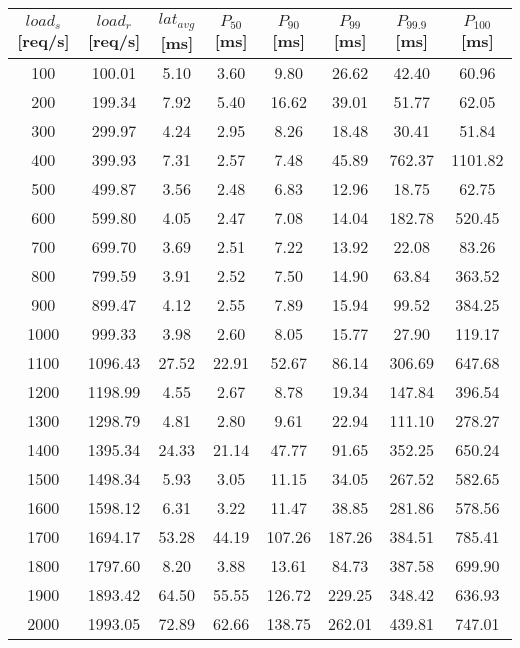 \begin{table}[!h]
	\begin{adjustwidth}{-2cm}{-2cm}
		\begin{tabular}{|c|c|c|c|c|c|c|c|}
			\hline
			 $load_{s}$ [req/s] & $load_{r}$ [req/s] & $lat_{avg}$ [ms] & $P_{50}$ [ms] & $P_{90}$ [ms] & $P_{99}$ [ms] & $P_{99.9}$ [ms] & $P_{100}$ [ms] \\
			\hline
			100 & 100.01 & 5.10 & 3.60 & 9.80 & 26.62 & 42.40 & 60.96 \\ \hline
			200 & 199.34 & 7.92 & 5.40 & 16.62 & 39.01 & 51.77 & 62.05 \\ \hline
			300 & 299.97 & 4.24 & 2.95 & 8.26 & 18.48 & 30.41 & 51.84 \\ \hline
			400 & 399.93 & 7.31 & 2.57 & 7.48 & 45.89 & 762.37 & 1101.82 \\ \hline
			500 & 499.87 & 3.56 & 2.48 & 6.83 & 12.96 & 18.75 & 62.75 \\ \hline
			600 & 599.80 & 4.05 & 2.47 & 7.08 & 14.04 & 182.78 & 520.45 \\ \hline
			700 & 699.70 & 3.69 & 2.51 & 7.22 & 13.92 & 22.08 & 83.26 \\ \hline
			800 & 799.59 & 3.91 & 2.52 & 7.50 & 14.90 & 63.84 & 363.52 \\ \hline
			900 & 899.47 & 4.12 & 2.55 & 7.89 & 15.94 & 99.52 & 384.25 \\ \hline
			1000 & 999.33 & 3.98 & 2.60 & 8.05 & 15.77 & 27.90 & 119.17 \\ \hline
			1100 & 1096.43 & 27.52 & 22.91 & 52.67 & 86.14 & 306.69 & 647.68 \\ \hline
			1200 & 1198.99 & 4.55 & 2.67 & 8.78 & 19.34 & 147.84 & 396.54 \\ \hline
			1300 & 1298.79 & 4.81 & 2.80 & 9.61 & 22.94 & 111.10 & 278.27 \\ \hline
			1400 & 1395.34 & 24.33 & 21.14 & 47.77 & 91.65 & 352.25 & 650.24 \\ \hline
			1500 & 1498.34 & 5.93 & 3.05 & 11.15 & 34.05 & 267.52 & 582.65 \\ \hline
			1600 & 1598.12 & 6.31 & 3.22 & 11.47 & 38.85 & 281.86 & 578.56 \\ \hline
			1700 & 1694.17 & 53.28 & 44.19 & 107.26 & 187.26 & 384.51 & 785.41 \\ \hline
			1800 & 1797.60 & 8.20 & 3.88 & 13.61 & 84.73 & 387.58 & 699.90 \\ \hline
			1900 & 1893.42 & 64.50 & 55.55 & 126.72 & 229.25 & 348.42 & 636.93 \\ \hline
			2000 & 1993.05 & 72.89 & 62.66 & 138.75 & 262.01 & 439.81 & 747.01 \\ \hline

\end{tabular}
\end{adjustwidth}
\end{table}
